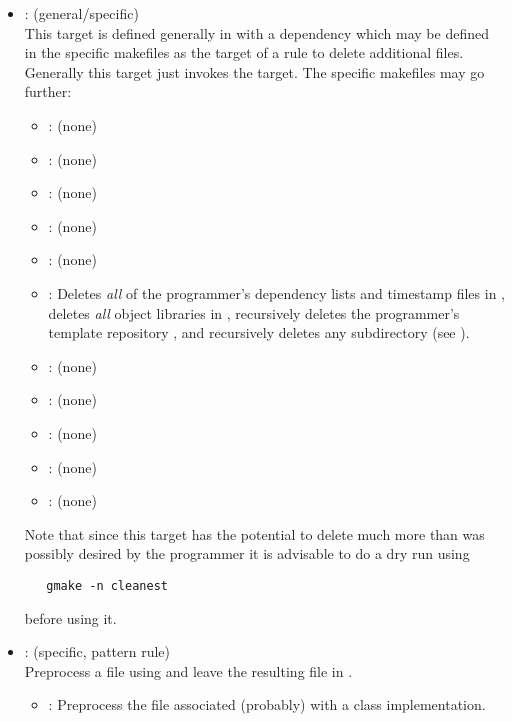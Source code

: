 \begin{itemize}
\item
    : (general/specific)
   \\ This target is defined generally in  with a dependency
   which may be defined in the specific makefiles as the target of a rule to
   delete additional files.  Generally this target just invokes the
    target.  The specific makefiles may go further:
   \begin{itemize}
   \item
      : (none)
   \item
      : (none)
   \item
      : (none)
   \item
      : (none)
   \item
      : (none)
   \item
      : Deletes {\em all} of the programmer's dependency lists and
      timestamp files in , deletes {\em all} object
      libraries in , recursively deletes the programmer's
      template repository , and recursively deletes any
       subdirectory (see ).
   \item
      : (none)
   \item
      : (none)
   \item
      : (none)
   \item
      : (none)
   \item
      : (none)
   \end{itemize}

   \noindent
   Note that since this target has the potential to delete much more than
   was possibly desired by the programmer it is advisable to do a dry run
   using

\begin{verbatim}
   gmake -n cleanest
\end{verbatim}

   \noindent
   before using it.

\item
    : (specific, pattern rule)
   \\ Preprocess a  file using  and leave the resulting
    file in .
   \begin{itemize}
   \item
      : Preprocess the  file associated (probably) with a
      class implementation.
   \end{itemize}


\end{itemize}
